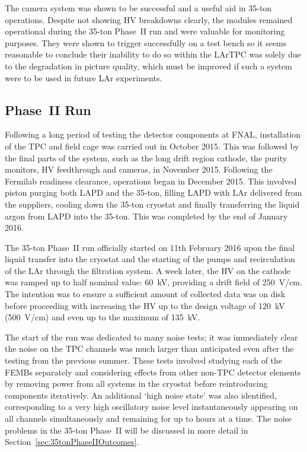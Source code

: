 The camera system was shown to be successful and a useful aid in 35-ton operations.  Despite not showing HV breakdowns clearly, the modules remained operational during the 35-ton Phase~II run and were valuable for monitoring purposes.  They were shown to trigger successfully on a test bench so it seems reasonable to conclude their inability to do so within the LArTPC was solely due to the degradation in picture quality, which must be improved if such a system were to be used in future LAr experiments.

\subsection{Phase~II Run}\label{sec:35tonPhaseIIRun}

Following a long period of testing the detector components at FNAL, installation of the TPC and field cage was carried out in October 2015.  This was followed by the final parts of the system, such as the long drift region cathode, the purity monitors, HV feedthrough and cameras, in November 2015.  Following the Fermilab readiness clearance, operations began in December 2015.  This involved piston purging both LAPD and the 35-ton, filling LAPD with LAr delivered from the suppliers, cooling down the 35-ton cryostat and finally transferring the liquid argon from LAPD into the 35-ton.  This was completed by the end of January 2016.

The 35-ton Phase~II run officially started on 11th February 2016 upon the final liquid transfer into the cryostat and the starting of the pumps and recirculation of the LAr through the filtration system.  A week later, the HV on the cathode was ramped up to half nominal value: 60~kV, providing a drift field of 250~V/cm.  The intention was to ensure a sufficient amount of collected data was on disk before proceeding with increasing the HV up to the design voltage of 120~kV (500~V/cm) and even up to the maximum of 135~kV.

The start of the run was dedicated to many noise tests; it was immediately clear the noise on the TPC channels was much larger than anticipated even after the testing from the previous summer.  These tests involved studying each of the FEMBs separately and considering effects from other non-TPC detector elements by removing power from all systems in the cryostat before reintroducing components iteratively.  An additional `high noise state' was also identified, corresponding to a very high oscillatory noise level instantaneously appearing on all channels simultaneously and remaining for up to hours at a time.  The noise problems in the 35-ton Phase~II will be discussed in more detail in Section~\ref{sec:35tonPhaseIIOutcomes}.

